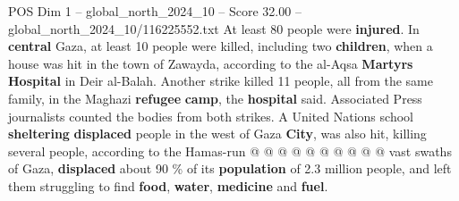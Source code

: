 \begin{textsample}{POS Dim 1 – global\_north\_2024\_10 – Score 32.00 – global\_north\_2024\_10/116225552.txt}
At least 80 people were \textbf{injured}.
In \textbf{central} Gaza, at least 10 people were killed, including two \textbf{children}, when a house was hit in the town of Zawayda, according to the al-Aqsa \textbf{Martyrs} \textbf{Hospital} in Deir al-Balah.
Another strike killed 11 people, all from the same family, in the Maghazi \textbf{refugee} \textbf{camp}, the \textbf{hospital} said.
Associated Press journalists counted the bodies from both strikes.
A United Nations school \textbf{sheltering} \textbf{displaced} people in the west of Gaza \textbf{City}, was also hit, killing several people, according to the Hamas-run @ @ @ @ @ @ @ @ @ @ vast swaths of Gaza, \textbf{displaced} about 90 \% of its \textbf{population} of 2.3 million people, and left them struggling to find \textbf{food}, \textbf{water}, \textbf{medicine} and \textbf{fuel}.

\end{textsample}
